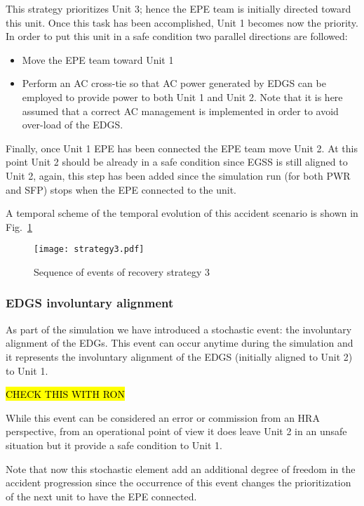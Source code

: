This strategy prioritizes Unit 3; hence the EPE team is initially directed toward this unit. 
Once this task has been accomplished, Unit 1 becomes now the priority. In order to put this unit in a safe 
condition two parallel directions are followed: 

\begin{itemize}
  \item Move the EPE team toward Unit 1 
  \item Perform an AC cross-tie so that AC power generated by EDGS can be employed to provide power to both Unit
        1 and Unit 2. Note that it is here assumed that a correct AC management is implemented in order to avoid
        over-load of the EDGS.
\end{itemize}

Finally, once Unit 1 EPE has been connected the EPE team move Unit 2. At this point Unit 2 should be already in a 
safe condition since EGSS is still aligned to Unit 2, again, this step has been added since the simulation run (for 
both PWR and SFP) stops when the EPE connected to the unit.

A temporal scheme of the temporal evolution of this accident scenario is shown in Fig.~\ref{fig:strategy3Scheme}

\begin{figure}
    \centering
    \centerline{\texttt{[image: strategy3.pdf]}}
    \caption{Sequence of events of recovery strategy 3}
    \label{fig:strategy3Scheme}
\end{figure}

\subsubsection{EDGS involuntary alignment}
\label{sec:EDGSinvolAlign}

As part of the simulation we have introduced a stochastic event: the involuntary alignment of the EDGs.
This event can occur anytime during the simulation and it represents the involuntary alignment of the EDGS 
(initially aligned to Unit 2) to Unit 1. 

\hl{CHECK THIS WITH RON}

While this event can be considered an error or commission from an HRA perspective, from an operational point of view 
it does leave Unit 2 in an unsafe situation but it provide a safe condition to Unit 1. 

Note that now this stochastic element add an additional degree of freedom in the accident progression since the 
occurrence of this event changes the prioritization of the next unit to have the EPE connected.

